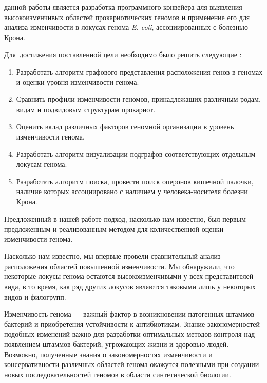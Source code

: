 {\aim} данной работы является разработка программного конвейера для выявления высокоизменчивых областей прокариотических геномов и применение его для анализа изменчивости в локусах генома \textit{E. coli}, ассоциированных с болезнью Крона.


Для~достижения поставленной цели необходимо было решить следующие {\tasks}:
\begin{enumerate}[beginpenalty=10000] %
  \item Разработать алгоритм графового представления расположения генов в геномах и оценки уровня изменчивости генома.
  \item Сравнить профили изменчивости геномов, принадлежащих различным родам, видам и подвидовым структурам прокариот.
  \item Оценить вклад различных факторов геномной организации в уровень изменчивости генома. 
  \item Разработать алгоритм визуализации подграфов соответствующих отдельным локусам генома.
  \item Разработать алгоритм поиска, провести поиск оперонов кишечной палочки, наличие которых ассоциировано с наличием у человека-носителя болезни Крона.  
\end{enumerate}


{\novelty}
Предложенный в нашей работе подход, насколько нам известно, был первым предложенным и реализованным методом для количественной оценки изменчивости генома. 

Насколько нам известно, мы впервые провели сравнительный анализ расположения областей повышенной изменчивости. Мы обнаружили, что некоторые локусы генома остаются высокоизменчивыми у всех представителей вида, в то время, как ряд других локусов являются таковыми лишь у некоторых видов и филогрупп. 

{\influence} 

Изменчивость генома --- важный фактор в возникновении патогенных штаммов бактерий и приобретения устойчивости к антибиотикам. Знание закономерностей подобных изменений важно для разработки оптимальных методов контроля над появлением штаммов бактерий, угрожающих жизни и здоровью людей. Возможно, полученные знания о закономерностях изменчивости и консервативности различных областей генома окажутся полезными при создании новых последовательностей геномов в области синтетической биологии. 


